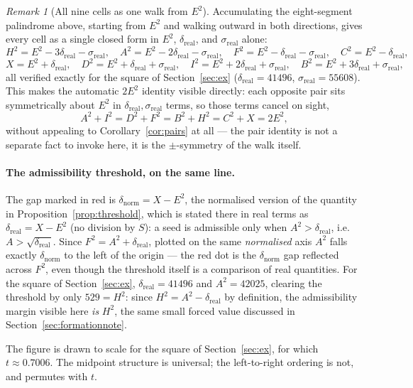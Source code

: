 \documentclass[12pt]{article}
\theoremstyle{remark}
\newtheorem{remark}[theorem]{Remark}
\begin{document}
\begin{remark}[All nine cells as one walk from $E^2$]
Accumulating the eight-segment palindrome above, starting from $E^2$
and walking outward in both directions, gives every cell as a single
closed form in $E^2$, $\delta_{\text{real}}$, and $\sigma_{\text{real}}$
alone:
\[
H^2 = E^2-3\delta_{\text{real}}-\sigma_{\text{real}}, \quad
A^2 = E^2-2\delta_{\text{real}}-\sigma_{\text{real}}, \quad
F^2 = E^2-\delta_{\text{real}}-\sigma_{\text{real}}, \quad
C^2 = E^2-\delta_{\text{real}},
\]
\[
X = E^2+\delta_{\text{real}}, \quad
D^2 = E^2+\delta_{\text{real}}+\sigma_{\text{real}}, \quad
I^2 = E^2+2\delta_{\text{real}}+\sigma_{\text{real}}, \quad
B^2 = E^2+3\delta_{\text{real}}+\sigma_{\text{real}} ,
\]
all verified exactly for the square of Section~\ref{sec:ex}
($\delta_{\text{real}}=41496$, $\sigma_{\text{real}}=55608$). This
makes the automatic $2E^2$ identity visible directly: each opposite
pair sits symmetrically about $E^2$ in $\delta_{\text{real}},
\sigma_{\text{real}}$ terms, so those terms cancel on sight,
\[
A^2+I^2 = D^2+F^2 = B^2+H^2 = C^2+X = 2E^2 ,
\]
without appealing to Corollary~\ref{cor:pairs} at all --- the pair
identity is not a separate fact to invoke here, it is the
$\pm$-symmetry of the walk itself.
\end{remark}

\paragraph{The admissibility threshold, on the same line.}
The gap marked in red is $\delta_{\text{norm}} = X - E^2$, the
normalised version of the quantity in Proposition~\ref{prop:threshold},
which is stated there in real terms as
$\delta_{\text{real}} = X - E^2$ (no division by $S$): a seed is
admissible only when $A^2 > \delta_{\text{real}}$, i.e.\
$A > \sqrt{\delta_{\text{real}}}$. Since
$F^2 = A^2 + \delta_{\text{real}}$, plotted on the same
\emph{normalised} axis $A^2$ falls exactly $\delta_{\text{norm}}$ to
the left of the origin --- the red dot is the
$\delta_{\text{norm}}$ gap reflected across $F^2$, even though the
threshold itself is a comparison of real quantities. For the square
of Section~\ref{sec:ex}, $\delta_{\text{real}} = 41496$ and
$A^2 = 42025$, clearing the threshold by only $529 = H^2$: since
$H^2 = A^2 - \delta_{\text{real}}$ by definition, the admissibility
margin visible here \emph{is} $H^2$, the same small forced value
discussed in Section~\ref{sec:formationnote}.

The figure is drawn to scale for the square of Section~\ref{sec:ex},
for which $t \approx 0.7006$. The midpoint structure is universal; the
left-to-right ordering is not, and permutes with $t$.
\end{document}
